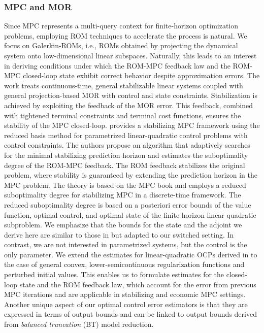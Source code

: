 \documentclass[reqno]{amsart}
\newcommand{\abbr}[1]{\textsf{#1}\xspace}
\newcommand{\ROM}{\abbr{ROM}}
\newcommand{\ROMs}{\abbr{ROMs}}
\newcommand{\MPC}{\abbr{MPC}}
\newcommand{\MOR}{\abbr{MOR}}
\newcommand{\OCPs}{\abbr{OCPs}}
\newcommand{\BT}{\abbr{BT}} %
\begin{document}
\subsubsection{\MPC and \MOR}
%
Since \MPC represents a multi-query context for finite-horizon optimization problems, employing \ROM techniques to accelerate the process is natural. We focus on Galerkin-\ROMs, i.e., \ROMs obtained by projecting the dynamical system onto low-dimensional linear subspaces. Naturally, this leads to an interest in deriving conditions under which the \ROM-\MPC feedback law and the \ROM-\MPC closed-loop state exhibit correct behavior despite approximation errors.
The work \cite{loehning2014model} treats continuous-time, general stabilizable linear systems coupled with general projection-based \MOR with control and state constraints. Stabilization is achieved by exploiting the feedback of the \MOR error. This feedback, combined with tightened terminal constraints and terminal cost functions, ensures the stability of the \MPC closed-loop.
\cite{DieG23} provides a stabilizing \MPC framework using the reduced basis method for parametrized linear-quadratic control problems with control constraints. The authors propose an algorithm that adaptively searches for the minimal stabilizing prediction horizon and estimates the suboptimality degree of the \ROM-\MPC feedback.
The \ROM feedback stabilizes the original problem, where stability is guaranteed by extending the prediction horizon in the \MPC problem. The theory is based on the \MPC book \cite{grune2017nonlinear} and employs a reduced suboptimality degree for stabilizing \MPC in a discrete-time framework. The reduced suboptimality degree is based on a posteriori error bounds of the value function, optimal control, and optimal state of the finite-horizon linear quadratic subproblem. We emphasize that the bounds for the state and the adjoint we derive here are similar to those in \cite{DieG23} but adapted to our switched setting. In contrast, we are not interested in parametrized systems, but the control is the only parameter. We extend the estimates for linear-quadratic \OCPs derived in \cite{DBLP:journals/coap/TroltzschV09,AliH18} to the case of general convex, lower-semicontinuous regularization functions and perturbed initial values. This enables us to formulate estimates for the closed-loop state and the \ROM feedback law, which account for the error from previous \MPC iterations and are applicable in stabilizing and economic \MPC settings. Another unique aspect of our optimal control error estimators is that they are expressed in terms of output bounds and can be linked to output bounds derived from \emph{balanced truncation} (\BT) model reduction.
\end{document}
